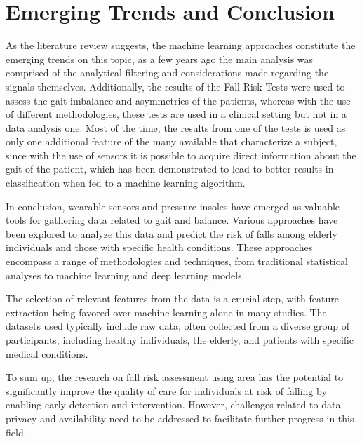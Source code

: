 \section{Emerging Trends and Conclusion}

As the literature review suggests, the machine learning approaches constitute the emerging trends on this topic, as a few years ago the main analysis was comprised of the analytical filtering and considerations made regarding the signals themselves. 
Additionally, the results of the Fall Risk Tests were used to assess the gait imbalance and asymmetries of the patients, whereas with the use of different methodologies, these tests are used in a clinical setting but not in a data analysis one.
Most of the time, the results from one of the tests is used as only one additional feature of the many available that characterize a subject, since with the use of sensors it is possible to acquire direct information about the gait of the patient, which has been demonstrated to lead to better results in classification when fed to a machine learning algorithm.

In conclusion, wearable sensors and pressure insoles have emerged as valuable tools for gathering data related to gait and balance. Various approaches have been explored to analyze this data and predict the risk of falls among elderly individuals and those with specific health conditions. These approaches encompass a range of methodologies and techniques, from traditional statistical analyses to machine learning and deep learning models.

The selection of relevant features from the data is a crucial step, with feature extraction being favored over machine learning alone in many studies. 
The datasets used typically include raw data, often collected from a diverse group of participants, including healthy individuals, the elderly, and patients with specific medical conditions.

To sum up, the research on fall risk assessment using area has the potential to significantly improve the quality of care for individuals at risk of falling by enabling early detection and intervention. However, challenges related to data privacy and availability need to be addressed to facilitate further progress in this field. 

